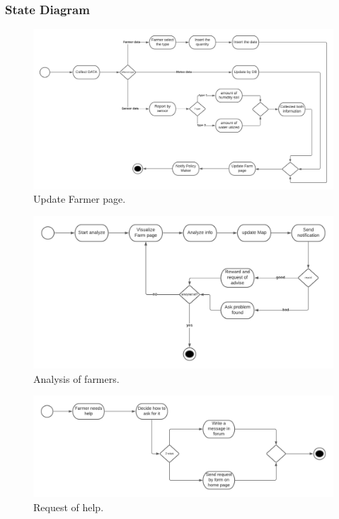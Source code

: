 \documentclass{article}
\begin{document}
\subsubsection{State Diagram}
\begin{figure}[H]
    \begin{center}
    \includegraphics[width=1\textwidth]{images/State chart 1.png}
    \caption{Update Farmer page.}
    \label{fig:state1}
    \end{center}
\end{figure}
\begin{figure}[H]
    \begin{center}
    \includegraphics[width=1\textwidth]{images/State chart 2.png}
    \caption{Analysis of farmers.}
    \label{fig:state2}
    \end{center}
\end{figure}
\begin{figure}[H]
    \begin{center}
    \includegraphics[width=1\textwidth]{images/State chart 3.png}
    \caption{Request of help.}
    \label{fig:state3}
    \end{center}
\end{figure}
\newpage
\end{document}
